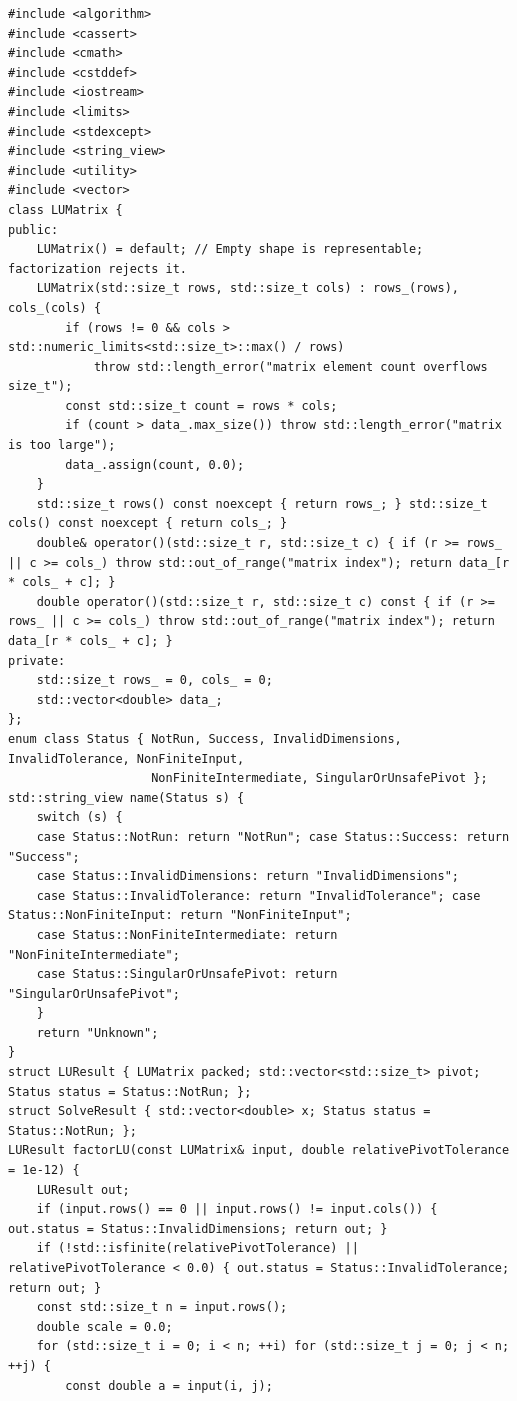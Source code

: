 \begin{verbatim}
#include <algorithm>
#include <cassert>
#include <cmath>
#include <cstddef>
#include <iostream>
#include <limits>
#include <stdexcept>
#include <string_view>
#include <utility>
#include <vector>
class LUMatrix {
public:
    LUMatrix() = default; // Empty shape is representable; factorization rejects it.
    LUMatrix(std::size_t rows, std::size_t cols) : rows_(rows), cols_(cols) {
        if (rows != 0 && cols > std::numeric_limits<std::size_t>::max() / rows)
            throw std::length_error("matrix element count overflows size_t");
        const std::size_t count = rows * cols;
        if (count > data_.max_size()) throw std::length_error("matrix is too large");
        data_.assign(count, 0.0);
    }
    std::size_t rows() const noexcept { return rows_; } std::size_t cols() const noexcept { return cols_; }
    double& operator()(std::size_t r, std::size_t c) { if (r >= rows_ || c >= cols_) throw std::out_of_range("matrix index"); return data_[r * cols_ + c]; }
    double operator()(std::size_t r, std::size_t c) const { if (r >= rows_ || c >= cols_) throw std::out_of_range("matrix index"); return data_[r * cols_ + c]; }
private:
    std::size_t rows_ = 0, cols_ = 0;
    std::vector<double> data_;
};
enum class Status { NotRun, Success, InvalidDimensions, InvalidTolerance, NonFiniteInput,
                    NonFiniteIntermediate, SingularOrUnsafePivot };
std::string_view name(Status s) {
    switch (s) {
    case Status::NotRun: return "NotRun"; case Status::Success: return "Success";
    case Status::InvalidDimensions: return "InvalidDimensions";
    case Status::InvalidTolerance: return "InvalidTolerance"; case Status::NonFiniteInput: return "NonFiniteInput";
    case Status::NonFiniteIntermediate: return "NonFiniteIntermediate";
    case Status::SingularOrUnsafePivot: return "SingularOrUnsafePivot";
    }
    return "Unknown";
}
struct LUResult { LUMatrix packed; std::vector<std::size_t> pivot; Status status = Status::NotRun; };
struct SolveResult { std::vector<double> x; Status status = Status::NotRun; };
LUResult factorLU(const LUMatrix& input, double relativePivotTolerance = 1e-12) {
    LUResult out;
    if (input.rows() == 0 || input.rows() != input.cols()) { out.status = Status::InvalidDimensions; return out; }
    if (!std::isfinite(relativePivotTolerance) || relativePivotTolerance < 0.0) { out.status = Status::InvalidTolerance; return out; }
    const std::size_t n = input.rows();
    double scale = 0.0;
    for (std::size_t i = 0; i < n; ++i) for (std::size_t j = 0; j < n; ++j) {
        const double a = input(i, j);

\end{verbatim}
